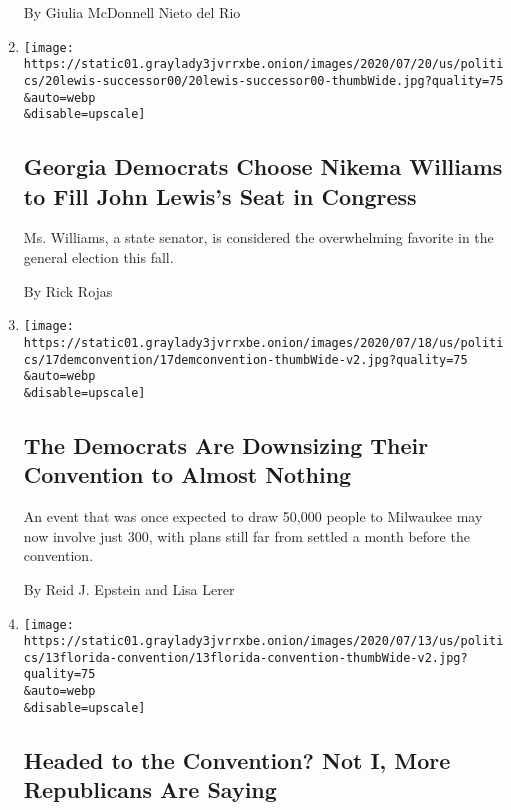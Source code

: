 \begin{enumerate}
  By Giulia McDonnell Nieto del Rio
\item
  \href{/2020/07/20/us/politics/john-lewis-successor-congress.html}{}

  \texttt{[image: https://static01.graylady3jvrrxbe.onion/images/2020/07/20/us/politics/20lewis-successor00/20lewis-successor00-thumbWide.jpg?quality=75\\\&auto=webp\\\&disable=upscale]}

  \hypertarget{georgia-democrats-choose-nikema-williams-to-fill-john-lewiss-seat-in-congress}{%
  \subsection{Georgia Democrats Choose Nikema Williams to Fill John
  Lewis's Seat in
  Congress}\label{georgia-democrats-choose-nikema-williams-to-fill-john-lewiss-seat-in-congress}}

  Ms. Williams, a state senator, is considered the overwhelming favorite
  in the general election this fall.

  By Rick Rojas
\item
  \href{/2020/07/17/us/politics/democratic-convention-milwaukee.html}{}

  \texttt{[image: https://static01.graylady3jvrrxbe.onion/images/2020/07/18/us/politics/17demconvention/17demconvention-thumbWide-v2.jpg?quality=75\\\&auto=webp\\\&disable=upscale]}

  \hypertarget{the-democrats-are-downsizing-their-convention-to-almost-nothing}{%
  \subsection{The Democrats Are Downsizing Their Convention to Almost
  Nothing}\label{the-democrats-are-downsizing-their-convention-to-almost-nothing}}

  An event that was once expected to draw 50,000 people to Milwaukee may
  now involve just 300, with plans still far from settled a month before
  the convention.

  By Reid J. Epstein and Lisa Lerer
\item
  \href{/2020/07/13/us/politics/florida-virus-republican-convention.html}{}

  \texttt{[image: https://static01.graylady3jvrrxbe.onion/images/2020/07/13/us/politics/13florida-convention/13florida-convention-thumbWide-v2.jpg?quality=75\\\&auto=webp\\\&disable=upscale]}

  \hypertarget{headed-to-the-convention-not-i-more-republicans-are-saying}{%
  \subsection{Headed to the Convention? Not I, More Republicans Are
  Saying}\label{headed-to-the-convention-not-i-more-republicans-are-saying}}


\end{enumerate}

